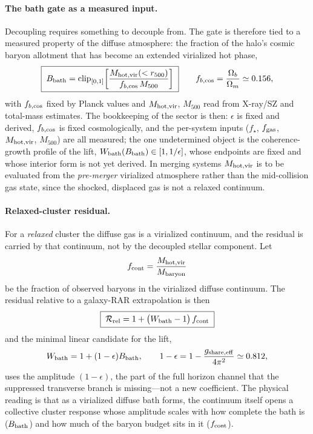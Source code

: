 \documentclass[11pt]{article}
\begin{document}
\paragraph{The bath gate as a measured input.}
Decoupling requires something to decouple from. The gate is therefore tied to a measured property of the diffuse atmosphere: the fraction of the halo's cosmic baryon allotment that has become an extended virialized hot phase,
\[
\boxed{\;
B_{\rm bath}
=
\mathrm{clip}_{[0,1]}\!\left[
\frac{M_{\rm hot,vir}(<r_{500})}{f_{b,\rm cos}\,M_{500}}
\right]\;}
\qquad
f_{b,\rm cos}=\frac{\Omega_b}{\Omega_m}\simeq 0.156 ,
\]
with $f_{b,\rm cos}$ fixed by Planck values \citep{Planck2020} and $M_{\rm hot,vir}$, $M_{500}$ read from X-ray/SZ and total-mass estimates. The bookkeeping of the sector is then: $\epsilon$ is fixed and derived, $f_{b,\rm cos}$ is fixed cosmologically, and the per-system inputs ($f_\star$, $f_{\rm gas}$, $M_{\rm hot,vir}$, $M_{500}$) are all measured; the one undetermined object is the coherence-growth profile of the lift, $W_{\rm bath}(B_{\rm bath})\in[1,1/\epsilon]$, whose endpoints are fixed and whose interior form is not yet derived. In merging systems $M_{\rm hot,vir}$ is to be evaluated from the \emph{pre-merger} virialized atmosphere rather than the mid-collision gas state, since the shocked, displaced gas is not a relaxed continuum.

\paragraph{Relaxed-cluster residual.}
For a \emph{relaxed} cluster the diffuse gas is a virialized continuum, and the residual is carried by that continuum, not by the decoupled stellar component. Let
\[
f_{\rm cont}=\frac{M_{\rm hot,vir}}{M_{\rm baryon}}
\]
be the fraction of observed baryons in the virialized diffuse continuum. The residual relative to a galaxy-RAR extrapolation is then
\[
\boxed{\;
\mathcal R_{\rm rel}
=
1+\big(W_{\rm bath}-1\big)\,f_{\rm cont}\;}
\]
and the minimal linear candidate for the lift,
\[
W_{\rm bath}=1+(1-\epsilon)B_{\rm bath},
\qquad
1-\epsilon=1-\frac{g_{\mathrm{share,eff}}}{4\pi^2}\simeq 0.812 ,
\]
uses the amplitude $(1-\epsilon)$, the part of the full horizon channel that the suppressed transverse branch is missing---not a new coefficient. The physical reading is that as a virialized diffuse bath forms, the continuum itself opens a collective cluster response whose amplitude scales with how complete the bath is ($B_{\rm bath}$) and how much of the baryon budget sits in it ($f_{\rm cont}$).
\end{document}
